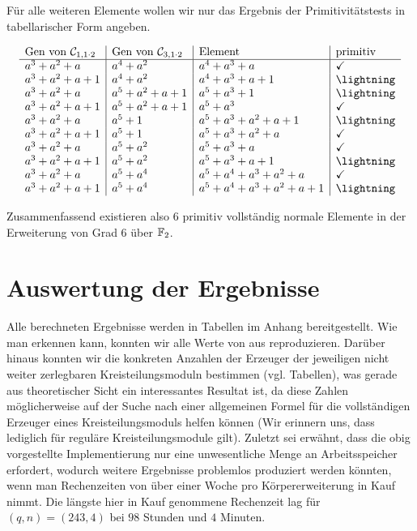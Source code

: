 Für alle weiteren Elemente wollen wir nur das Ergebnis der Primitivitätstests
in tabellarischer Form angeben.

\[\begin{array}{l|l|l|l}
  \text{Gen von } \C_{1,1\cdot 2} & \text{Gen von } \C_{3,1\cdot 2} &
    \text{Element} & 
    \text{primitiv} \\\hline
  a^3+a^2+a & a^4+a^2 & a^4+a^3 +a & \checkmark\\
  a^3+a^2+a+1 & a^4+a^2 & a^4+a^3+a+1 & \lightning\\
  a^3+a^2+a & a^5+a^2+a+1 & a^5+a^3+1 & \lightning\\
  a^3+a^2+a+1 &a^5+a^2+a+1 & a^5+a^3 & \checkmark\\
  a^3+a^2+a & a^5+1 & a^5 +a^3+a^2+a+1& \lightning\\
  a^3+a^2+a+1 &a^5+1 & a^5+a^3+a^2+a &\checkmark\\
  a^3+a^2+a & a^5+a^2 & a^5+a^3+a & \checkmark\\
  a^3+a^2+a+1 & a^5+a^2& a^5+a^3+a+1 &\lightning\\
  a^3+a^2+a & a^5+a^4 & a^5+a^4+a^3+a^2+a &\checkmark\\
  a^3+a^2+a+1 & a^5+a^4 & a^5+a^4+a^3+a^2+a+1 &\lightning\\
  \end{array}\]

Zusammenfassend existieren also $6$ primitiv vollständig normale Elemente in
der Erweiterung von Grad $6$ über $\mathbb{F}_2$.

\section{Auswertung der Ergebnisse}

Alle berechneten Ergebnisse werden in Tabellen im Anhang bereitgestellt.
Wie man erkennen kann, konnten wir alle Werte von 
\citeauthor{morgan1996} aus \autocite{morgan1996} reproduzieren. Darüber
hinaus konnten wir die konkreten Anzahlen der Erzeuger der jeweiligen 
nicht weiter zerlegbaren Kreisteilungsmoduln bestimmen (vgl. Tabellen), 
was gerade aus theoretischer Sicht ein interessantes Resultat ist, da diese
Zahlen möglicherweise auf der Suche nach einer allgemeinen Formel für die
vollständigen Erzeuger eines Kreisteilungsmoduls helfen können (Wir erinnern
uns, dass  lediglich für 
reguläre Kreisteilungsmodule gilt). 
Zuletzt sei erwähnt, dass die obig vorgestellte Implementierung nur
eine unwesentliche Menge an Arbeitsspeicher erfordert, wodurch weitere
Ergebnisse problemlos produziert werden könnten, wenn man Rechenzeiten von über
einer Woche pro Körpererweiterung in Kauf nimmt. Die längste hier in Kauf
genommene Rechenzeit lag für $(q,n)=(243,4)$ bei $98$ Stunden und $4$ Minuten.


